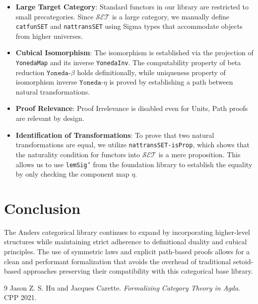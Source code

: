 \documentclass[11pt]{article}
\begin{document}
\begin{itemize}
    \item \textbf{Large Target Category}: Standard functors in our library are restricted to small precategories. Since $\mathcal{SET}$ is a large category, we manually define \texttt{catfunSET} and \texttt{nattransSET} using Sigma types that accommodate objects from higher universes.
    \item \textbf{Cubical Isomorphism}: The isomorphism is established via the projection of \texttt{YonedaMap} and its inverse \texttt{YonedaInv}. The computability property of beta reduction $\texttt{Yoneda-$\beta$}$ holds definitionally, while uniqueness property of isomorphism inverse $\texttt{Yoneda-$\eta$}$ is proved by establishing a path between natural transformations.
    \item \textbf{Proof Relevance}: Proof Irrelevance is disabled even for Units, Path proofs are relevant by design.
    \item \textbf{Identification of Transformations}: To prove that two natural transformations are equal, we utilize \texttt{nattransSET-isProp}, which shows that the naturality condition for functors into $\mathcal{SET}$ is a mere proposition. This allows us to use \texttt{lemSig'} from the foundation library to establish the equality by only checking the component map $\eta$.
\end{itemize}

\newpage
\section{Conclusion}

The Anders categorical library continues to expand by incorporating higher-level structures while
maintaining strict adherence to definitional duality and cubical principles. The use of symmetric
laws and explicit path-based proofs allows for a clean and performant formalization that avoids
the overhead of traditional setoid-based approaches preserving their compatibility with this categorical base library.

\begin{thebibliography}{9}
Jason Z. S. Hu and Jacques Carette.
\textit{Formalizing Category Theory in Agda}.
CPP 2021.
\end{thebibliography}
\end{document}
